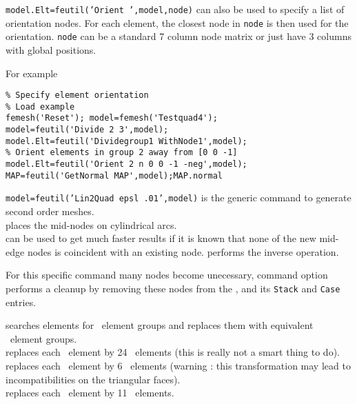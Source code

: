 {\tt model.Elt=feutil('Orient ',model,node)} can also be used to specify a list of orientation nodes. For each element, the closest node in {\tt node}  is then used for the orientation. {\tt node} can be a standard 7 column node matrix or just have 3 columns with global positions.

For example

\begin{verbatim}
% Specify element orientation
% Load example
femesh('Reset'); model=femesh('Testquad4'); 
model=feutil('Divide 2 3',model);
model.Elt=feutil('Dividegroup1 WithNode1',model); 
% Orient elements in group 2 away from [0 0 -1]
model.Elt=feutil('Orient 2 n 0 0 -1 -neg',model);
MAP=feutil('GetNormal MAP',model);MAP.normal
\end{verbatim}%




{\tt model=feutil('Lin2Quad epsl .01',model)} is the generic command to generate second order meshes.\\
 places the mid-nodes on cylindrical arcs.\\
 can be used to get much faster results if it is known that none of the new mid-edge nodes is coincident with an existing node.
 performs the inverse operation.\\
\begin{SDT}
For this specific command many nodes become unecessary, command option  performs a cleanup by removing these nodes from the , and its {\tt Stack} and {\tt Case} entries.
\end{SDT}
 searches elements for \quada\ element groups and replaces them with equivalent \triaa\ element groups.\\
 replaces each \hexah\ element by 24 \tetra\ elements (this is really not a smart thing to do).\\
 replaces each \hexah\ element by 6 \tetra\ elements (warning : this transformation may lead to incompatibilities on the triangular faces).\\
 replaces each \penta\ element by 11 \tetra\ elements. 

